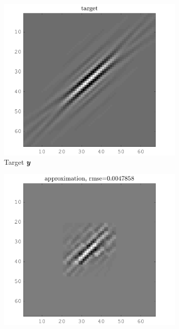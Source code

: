\begin{figure}[!ht]\centering
\begin{subfigure}[b]{0.49\textwidth}\centering
\includegraphics[width=\textwidth]{figures/xp/n4/xp_128x128_sc2_angl1_K3_S3_node4_target.png}
\caption{Target $\bm{y}$}
\end{subfigure}
\begin{subfigure}[b]{0.49\textwidth}\centering
\includegraphics[width=\textwidth]{figures/xp/n4/xp_128x128_sc2_angl1_K3_S3_node4_approx.png}

\end{subfigure}
\end{figure}
